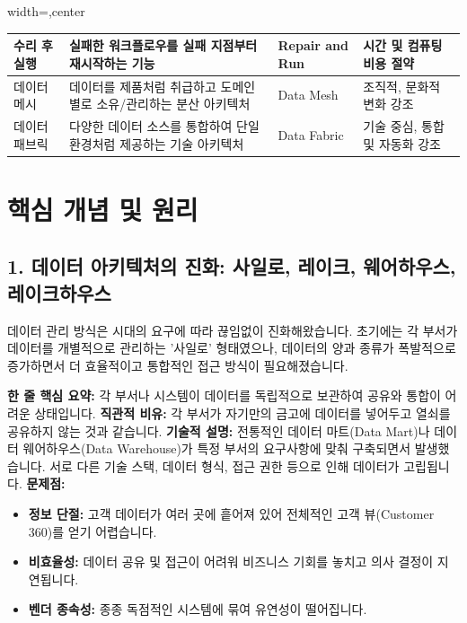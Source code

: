 \documentclass[11pt,a4paper]{article}
\theoremstyle{definition}
\begin{document}
\begin{tcolorbox}[title=\textbf{핵심 용어집}, colback=blue!5!white, colframe=blue!75!black, sharp corners, boxrule=0.8pt]
\begin{adjustbox}{width=\textwidth,center}
\begin{tabular}{llll}
수리 후 실행 & 실패한 워크플로우를 실패 지점부터 재시작하는 기능 & Repair and Run & 시간 및 컴퓨팅 비용 절약 \\
\midrule
데이터 메시 & 데이터를 제품처럼 취급하고 도메인별로 소유/관리하는 분산 아키텍처 & Data Mesh & 조직적, 문화적 변화 강조 \\
데이터 패브릭 & 다양한 데이터 소스를 통합하여 단일 환경처럼 제공하는 기술 아키텍처 & Data Fabric & 기술 중심, 통합 및 자동화 강조 \\
\bottomrule
\end{tabular}
\end{adjustbox}
\end{tcolorbox}

\newpage
\section{핵심 개념 및 원리}

\subsection*{1. 데이터 아키텍처의 진화: 사일로, 레이크, 웨어하우스, 레이크하우스}

데이터 관리 방식은 시대의 요구에 따라 끊임없이 진화해왔습니다. 초기에는 각 부서가 데이터를 개별적으로 관리하는 '사일로' 형태였으나, 데이터의 양과 종류가 폭발적으로 증가하면서 더 효율적이고 통합적인 접근 방식이 필요해졌습니다.

\begin{tcolorbox}[title=\textbf{데이터 사일로 (Data Silo)}, colback=red!5!white, colframe=red!75!black, sharp corners, boxrule=0.8pt]
\textbf{한 줄 핵심 요약:} 각 부서나 시스템이 데이터를 독립적으로 보관하여 공유와 통합이 어려운 상태입니다.
\textbf{직관적 비유:} 각 부서가 자기만의 금고에 데이터를 넣어두고 열쇠를 공유하지 않는 것과 같습니다.
\textbf{기술적 설명:} 전통적인 데이터 마트(Data Mart)나 데이터 웨어하우스(Data Warehouse)가 특정 부서의 요구사항에 맞춰 구축되면서 발생했습니다. 서로 다른 기술 스택, 데이터 형식, 접근 권한 등으로 인해 데이터가 고립됩니다.
\textbf{문제점:}
\begin{itemize}
    \item \textbf{정보 단절:} 고객 데이터가 여러 곳에 흩어져 있어 전체적인 고객 뷰(Customer 360)를 얻기 어렵습니다.
    \item \textbf{비효율성:} 데이터 공유 및 접근이 어려워 비즈니스 기회를 놓치고 의사 결정이 지연됩니다.
    \item \textbf{벤더 종속성:} 종종 독점적인 시스템에 묶여 유연성이 떨어집니다.
\end{itemize}
\end{tcolorbox}
\end{document}

